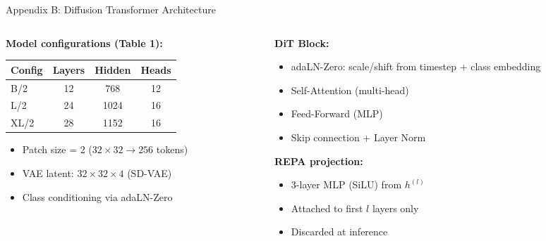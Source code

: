 \documentclass[aspectratio=169, 10pt]{beamer}
\begin{document}
\begin{frame}{Appendix B: Diffusion Transformer Architecture}
\small
\begin{columns}[T]
\begin{column}{0.50\textwidth}
\textbf{Model configurations (Table 1):}
\begin{center}
\begin{tabular}{lccc}
\toprule
\textbf{Config} & \textbf{Layers} & \textbf{Hidden} & \textbf{Heads} \\
\midrule
B/2  & 12 & 768  & 12 \\
L/2  & 24 & 1024 & 16 \\
XL/2 & 28 & 1152 & 16 \\
\bottomrule
\end{tabular}
\end{center}

\vspace{0.3em}
\begin{itemize}\setlength{\itemsep}{2pt}
  \item Patch size = 2 ($32{\times}32 \to 256$ tokens)
  \item VAE latent: $32{\times}32{\times}4$ (SD-VAE)
  \item Class conditioning via adaLN-Zero
\end{itemize}
\end{column}
\begin{column}{0.48\textwidth}
\textbf{DiT Block:}
\begin{itemize}\setlength{\itemsep}{2pt}
  \item adaLN-Zero: scale/shift from timestep + class embedding
  \item Self-Attention (multi-head)
  \item Feed-Forward (MLP)
  \item Skip connection + Layer Norm
\end{itemize}

\vspace{0.5em}
\textbf{REPA projection:}
\begin{itemize}\setlength{\itemsep}{2pt}
  \item 3-layer MLP (SiLU) from $h^{(l)}$
  \item Attached to first $l$ layers only
  \item Discarded at inference
\end{itemize}
\end{column}
\end{columns}
\end{frame}
\end{document}
